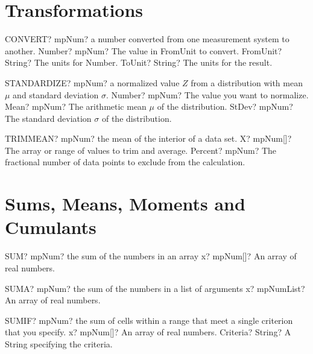 \documentclass[12pt,a4paper,openany]{book}
\begin{document}
\section{Transformations}

\begin{mpFunctionsExtract}
\mpWorksheetFunctionThreeNotImplemented
{CONVERT? mpNum? a number converted from one measurement system to another.}
{Number? mpNum? The value in \textsf{FromUnit} to convert.}
{FromUnit? String? The units for \textsf{Number}.}
{ToUnit? String? The units for the result.}
\end{mpFunctionsExtract}

\begin{mpFunctionsExtract}
\mpWorksheetFunctionThreeNotImplemented
{STANDARDIZE? mpNum? a normalized value  $Z$ from a distribution with mean $\mu$ and standard deviation $\sigma$.}
{Number? mpNum? The value you want to normalize.}
{Mean? mpNum? The arithmetic mean $\mu$ of the distribution.}
{StDev? mpNum? The standard deviation  $\sigma$ of the distribution.}
\end{mpFunctionsExtract}

\begin{mpFunctionsExtract}
\mpWorksheetFunctionTwoNotImplemented
{TRIMMEAN? mpNum? the mean of the interior of a data set.}
{X? mpNum[]? The array or range of values to trim and average.}
{Percent? mpNum? The fractional number of data points to exclude from the calculation.}
\end{mpFunctionsExtract}

\section{Sums, Means, Moments and Cumulants}

\begin{mpFunctionsExtract}
\mpWorksheetFunctionOneNotImplemented
{SUM? mpNum? the sum of the numbers in an array}
{x? mpNum[]? An array of real numbers.}
\end{mpFunctionsExtract}

\begin{mpFunctionsExtract}
\mpWorksheetFunctionOneNotImplemented
{SUMA? mpNum? the sum of the numbers in a list of arguments}
{x? mpNumList? An array of real numbers.}
\end{mpFunctionsExtract}

\begin{mpFunctionsExtract}
\mpWorksheetFunctionTwoNotImplemented
{SUMIF? mpNum? the sum of cells within a range that meet a single criterion that you specify.}
{x? mpNum[]? An array of real numbers.}
{Criteria? String? A String specifying the criteria.}
\end{mpFunctionsExtract}
\end{document}
